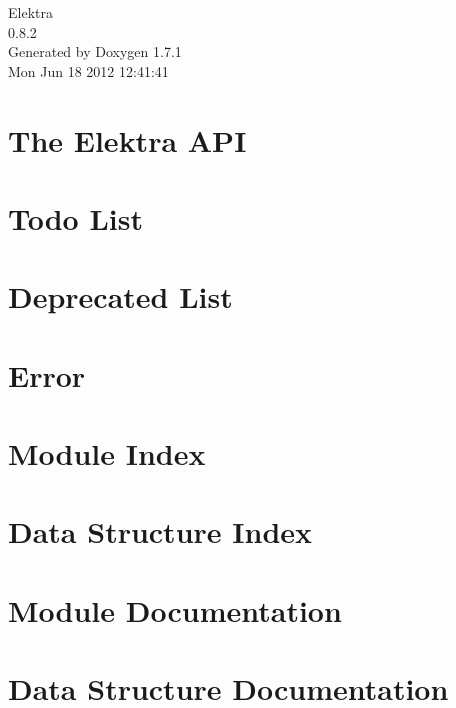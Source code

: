\documentclass[a4paper]{book}
\begin{document}
\hypersetup{pageanchor=false}
\begin{titlepage}
\vspace*{7cm}
\begin{center}
{\Large Elektra \\[1ex]\large 0.8.2 }\\
\vspace*{1cm}
{\large Generated by Doxygen 1.7.1}\\
\vspace*{0.5cm}
{\small Mon Jun 18 2012 12:41:41}\\
\end{center}
\end{titlepage}
\clearemptydoublepage
{}
\tableofcontents
\clearemptydoublepage
{}
\hypersetup{pageanchor=true}
\chapter{The Elektra API}
\label{index}\hypertarget{index}{}
\chapter{Todo List}
\label{todo}
\hypertarget{todo}{}

\chapter{Deprecated List}
\label{deprecated}
\hypertarget{deprecated}{}

\chapter{Error}
\label{err}
\hypertarget{err}{}

\chapter{Module Index}

\chapter{Data Structure Index}

\chapter{Module Documentation}













\chapter{Data Structure Documentation}







\printindex
\end{document}
